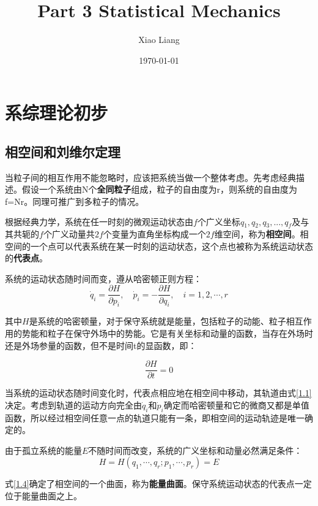 \documentclass[UTF8]{ctexart}
\title{Part 3 Statistical Mechanics}
\author{Xiao Liang}
\date{\today}
\newcommand{\firstsection}{\subsection}
\newcommand{\backdoc}{\normalsize}
\begin{document}
	\maketitle
	\tableofcontents
	\newpage
	\section{系综理论初步}
	\firstsection{相空间和刘维尔定理}
	
	\backdoc
	当粒子间的相互作用不能忽略时，应该把系统当做一个整体考虑。先考虑经典描述。假设一个系统由N个\textbf{全同粒子}组成，粒子的自由度为r，则系统的自由度为f=Nr。同理可推广到多粒子的情况。
	
	根据经典力学，系统在任一时刻的微观运动状态由$ f $个广义坐标$ q{_1},q{_2},q{_3},...,q{_f} $及与其共轭的$ f $个广义动量共$ 2f $个变量为直角坐标构成一个$ 2f $维空间，称为\textbf{相空间}。相空间的一个点可以代表系统在某一时刻的运动状态，这个点也被称为系统运动状态的\textbf{代表点}。
	
	系统的运动状态随时间而变，遵从哈密顿正则方程：
	\begin{equation}
	\dot{q}_{i}=\frac{\partial H}{\partial p_{i}}, \quad \dot{p}_{i}=-\frac{\partial H}{\partial q_{i}}, \quad i=1,2, \cdots, r\label{1.1}
	\end{equation}
	
	其中$ H $是系统的哈密顿量，对于保守系统就是能量，包括粒子的动能、粒子相互作用的势能和粒子在保守外场中的势能。它是有关坐标和动量的函数，当存在外场时还是外场参量的函数，但不是时间t的显函数，即：
	
	\begin{equation}
		\frac{\partial H}{\partial t}=0	
	\end{equation}
	
	当系统的运动状态随时间变化时，代表点相应地在相空间中移动，其轨道由式\ref{1.1}决定。考虑到轨道的运动方向完全由$ \dot{q}_{i} $和$ \dot{p}_{i} $确定而哈密顿量和它的微商又都是单值函数，所以经过相空间任意一点的轨道只能有一条，即相空间的运动轨迹是唯一确定的。
		
	由于孤立系统的能量$ E $不随时间而改变，系统的广义坐标和动量必然满足条件：
	\begin{equation}
	H=H\left(q_{1}, \cdots, q_{r} ; p_{1}, \cdots, p_{r}\right)=E\label{1.4}
	\end{equation}
	
	式\ref{1.4}确定了相空间的一个曲面，称为\textbf{能量曲面}。保守系统运动状态的代表点一定位于能量曲面之上。
	
\end{document}
